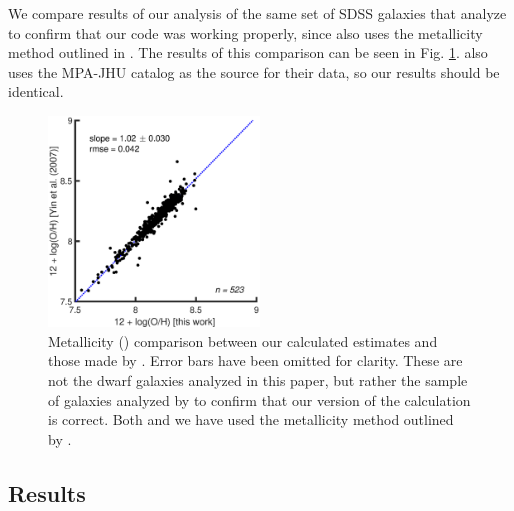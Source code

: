 We compare results of our analysis of the same set of SDSS galaxies that 
\cite{Yin07} analyze to confirm that our code was working properly, since 
\cite{Yin07} also uses the metallicity method outlined in \cite{Izotov06}.  The 
results of this comparison can be seen in Fig. \ref{fig:Yin07_comp}.  
\cite{Yin07} also uses the MPA-JHU catalog as the source for their data, so our 
results should be identical.

\begin{figure}
    \centering
    \includegraphics[width=0.5\textwidth]{Images/Paper1/Yin07_comparison_fit}
    \caption[Metallicity comparison to \cite{Yin07}]{Metallicity (\OH) 
    comparison between our calculated estimates and those made by \cite{Yin07}.  
    Error bars have been omitted for clarity.  These are not the dwarf galaxies 
    analyzed in this paper, but rather the sample of galaxies analyzed by 
    \cite{Yin07} to confirm that our version of the calculation is correct.  
    Both \cite{Yin07} and we have used the metallicity method outlined by 
    \cite{Izotov06}.}
    \label{fig:Yin07_comp}
\end{figure}


\subsection{Results}

